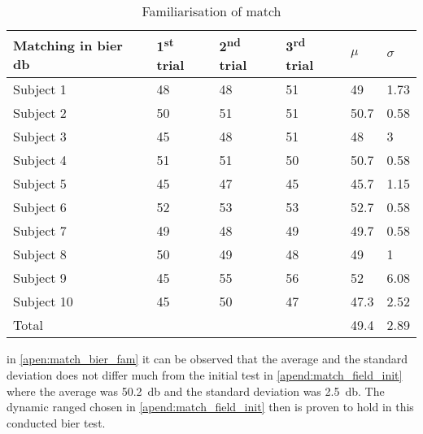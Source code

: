 \begin{table}[H]
\centering
\caption{Familiarisation of match}
\begin{tabular}{l|lll|ll}
Matching in bier \si{\decibel}  &1\textsuperscript{st} trial & 2\textsuperscript{nd} trial & 3\textsuperscript{rd} trial & $\mu$   & $\sigma$ \\ \hline
Subject 1           & 48    & 48    & 51    & 49   & 1.73  \\
Subject 2           & 50    & 51    & 51    & 50.7 & 0.58  \\
Subject 3           & 45    & 48    & 51    & 48   & 3     \\
Subject 4           & 51    & 51    & 50    & 50.7 & 0.58  \\
Subject 5           & 45    & 47    & 45    & 45.7 & 1.15  \\
Subject 6           & 52    & 53    & 53    & 52.7 & 0.58  \\
Subject 7           & 49    & 48    & 49    & 49.7 & 0.58  \\
Subject 8           & 50    & 49    & 48    & 49   & 1     \\
Subject 9           & 45    & 55    & 56    & 52   & 6.08  \\
Subject 10          & 45    & 50    & 47    & 47.3 & 2.52  \\ \hline
Total               &       &       &       & 49.4 & 2.89 
\end{tabular}
\label{apen:match_bier_fam} 
\end{table}

in \autoref{apen:match_bier_fam}  it can be observed that the average and the standard deviation does not differ much from the initial test in \autoref{apend:match_field_init} where the average was \SI{50.2}{\decibel} and the standard deviation was \SI{2.5}{\decibel}. The dynamic ranged chosen in  \autoref{apend:match_field_init} then is proven to hold in this conducted \gls{bier} test.


